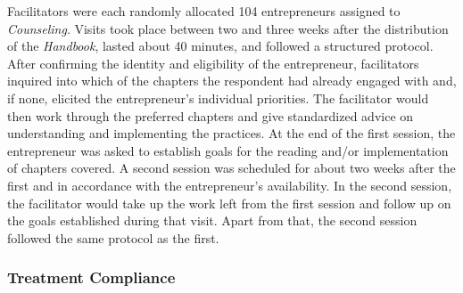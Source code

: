 \documentclass[11.5pt]{article}
\begin{document}
Facilitators were each randomly allocated 104 entrepreneurs assigned to \emph{Counseling}. Visits took place between two and three weeks after the distribution of the \emph{Handbook}, lasted about 40 minutes, and followed a structured protocol. After confirming the identity and eligibility of the entrepreneur, facilitators inquired into which of the chapters the respondent had already engaged with and, if none, elicited the entrepreneur's individual priorities. The facilitator would then work through the preferred chapters and give standardized advice on understanding and implementing the practices. %
At the end of the first session, the entrepreneur was asked to establish goals for the reading and/or implementation of chapters covered. A second session was scheduled for about two weeks after the first and in accordance with the entrepreneur's availability. In the second session, the facilitator would take up the work left from the first session and follow up on the goals established during that visit. Apart from that, the second session followed the same protocol as the first.

\subsubsection{Treatment Compliance}
\end{document}
